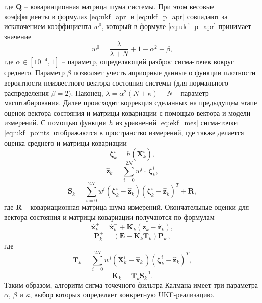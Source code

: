 где $\bm{Q}$ -- ковариационная матрица шума системы.
При этом весовые коэффициенты в формулах \eqref{eq:ukf_apr} и \eqref{eq:ukf_p_apr} совпадают за исключением коэффициента  ${w^0}$, который в формуле \eqref{eq:ukf_p_apr} принимает значение \cite{Kulikova01}
\begin{equation}
w^0 = \frac{{{\lambda }}}{{{{\lambda }} + N}} + 1 - {{{\alpha }}^2} + {{\beta }},
\end{equation}
где
${{\alpha }} \in \left[ {{{10}^{ - 4}},1} \right]$
-- параметр, определяющий разброс сигма-точек вокруг среднего.
Параметр ${{\beta }}$  позволяет учесть априорные данные о функции плотности вероятности неизвестного вектора состояния системы (для нормального распределения  ${{\beta }} = 2$). Наконец, ${{\lambda }} = {\alpha }^2 (N + \kappa) - N$ -- параметр масштабирования.
Далее происходит коррекция сделанных на предыдущем этапе оценок вектора состояния и матрицы ковариации с помощью вектора и модели измерений.
С помощью функции $h$ из уравнений \eqref{eq:ekf_mes} сигма-точки \eqref{eq:ukf_points} отображаются в пространство измерений, где также делается оценка среднего и матрицы ковариации
\begin{equation}
{\bm{\zeta }}_k^i = h\left( {{\bm{X}}_k^i} \right),
\end{equation}
\begin{equation}
{{{\bm{\hat z}}}_k} = \sum\limits_{i = 0}^{2N} {{w^i} \cdot } \,{\bm{\zeta }}_k^i,
\end{equation}
\begin{equation} \label{eq:ukf_s_k}
{{\bm{S}}_k} = \sum\limits_{i = 0}^{2N} {{w^i}\left( {{\bm{\zeta }}_k^i - {{{\bm{\hat z}}}_k}} \right)} {\left( {{\bm{\zeta }}_k^i - {{{\bm{\hat z}}}_k}} \right)^{{T}}} + {\bm{R}},
\end{equation}
где $\bm R$ -- ковариационная матрица шума измерений. Окончательные оценки для вектора состояния и матрицы ковариации получаются по формулам
\begin{equation}
{\bm{\hat x}}_k^ +  = {\bm{\hat x}}_k^ -  + {{\bm{K}}_k}({{\bm{z}}_k} - {{{\bm{\hat z}}}_k}),
\end{equation}
\begin{equation}
{\bm{P}}_k^ +  = \left( {{\bm{E}} - {{\bm{K}}_k}{{\bm{T}}_k}} \right){\bm{P}}_k^ - ,
\end{equation}
где
\begin{equation}
{{\bm{T}}_k} = \sum\limits_{i = 0}^{2N} {{w^i}\left( {{\bm{X}}_k^i - {\bm{\hat x}}_k^ - } \right)} {\left( {{\bm{\zeta }}_k^i - {{{\bm{\hat z}}}_k}} \right)^{{T}}},
\end{equation}
\begin{equation}
{{\bm{K}}_k} = {{\bm{T}}_k}{\bm{S}}_k^{ - 1}.
\end{equation}
Таким образом, алгоритм сигма-точечного фильтра Калмана имеет три параметра $\alpha$, $\beta$ и $\kappa$, выбор которых определяет конкретную UKF-реализацию.

